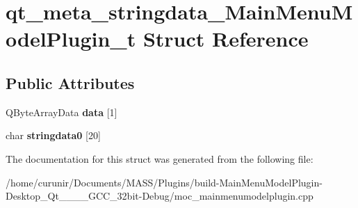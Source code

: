 \hypertarget{structqt__meta__stringdata___main_menu_model_plugin__t}{}\section{qt\+\_\+meta\+\_\+stringdata\+\_\+\+Main\+Menu\+Model\+Plugin\+\_\+t Struct Reference}
\label{structqt__meta__stringdata___main_menu_model_plugin__t}
\subsection*{Public Attributes}
\begin{DoxyCompactItemize}
\item 
Q\+Byte\+Array\+Data {\bfseries data} \mbox{[}1\mbox{]}\hypertarget{structqt__meta__stringdata___main_menu_model_plugin__t_aed020295692018c886c9043074c0d648}{}\label{structqt__meta__stringdata___main_menu_model_plugin__t_aed020295692018c886c9043074c0d648}

\item 
char {\bfseries stringdata0} \mbox{[}20\mbox{]}\hypertarget{structqt__meta__stringdata___main_menu_model_plugin__t_a80ad42362dd69b1243fb39a697eefa94}{}\label{structqt__meta__stringdata___main_menu_model_plugin__t_a80ad42362dd69b1243fb39a697eefa94}

\end{DoxyCompactItemize}


The documentation for this struct was generated from the following file\+:\begin{DoxyCompactItemize}
\item 
/home/curunir/\+Documents/\+M\+A\+S\+S/\+Plugins/build-\/\+Main\+Menu\+Model\+Plugin-\/\+Desktop\+\_\+\+Qt\+\_\+\_\+\_\+\_\+\+G\+C\+C\+\_\+32bit-\/\+Debug/moc\+\_\+mainmenumodelplugin.\+cpp\end{DoxyCompactItemize}
